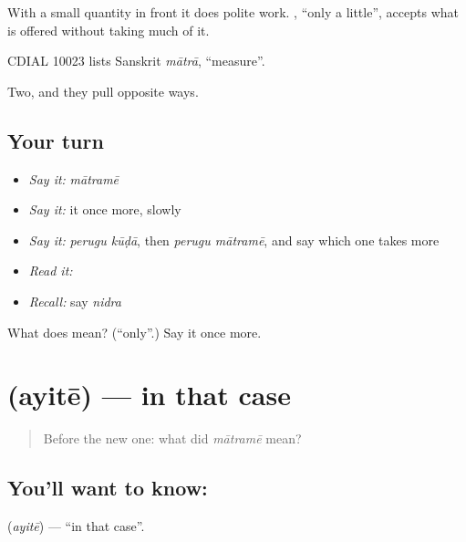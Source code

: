 With a small quantity in front it does polite work.  , \textquotedblleft{}only a little\textquotedblright{}, accepts what is offered without taking much of it.

CDIAL 10023 lists Sanskrit \emph{mātrā}, \textquotedblleft{}measure\textquotedblright{}.

\begin{grammarlens}[title={What you've built}]
Two, and they pull opposite ways.
\end{grammarlens}

\subsection*{Your turn}
\begin{itemize}
\raggedright
  \item \emph{Say it:} \emph{mātramē}
  \item \emph{Say it:} it once more, slowly
  \item \emph{Say it:} \emph{perugu kūḍā}, then \emph{perugu mātramē}, and say which one takes more
  \item \emph{Read it:} \textbf{}
  \item \emph{Recall:} say \emph{nidra}
\end{itemize}

\begin{tcolorbox}[breakable,colback=teal!4,colframe=teal!35!black,title={Before you move on}]
What does  mean? (\textquotedblleft{}only\textquotedblright{}.) Say it once more.
\end{tcolorbox}
\section[\texorpdfstring{\te{అయితే} (ayitē)}{అయితే (ayitē)}]{ (ayitē) — in that case}

\label{lesson:TE-C64-in-that-case}



\begin{quote}
Before the new one: what did \emph{mātramē} mean?
\end{quote}

\subsection*{You'll want to know: }
\textbf{} (\emph{ayitē}) — \textquotedblleft{}in that case\textquotedblright{}.

